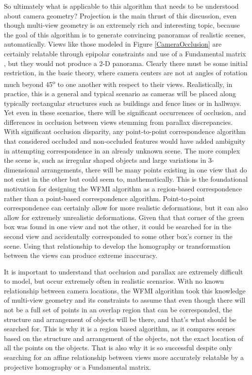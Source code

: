 So ultimately what is applicable to this algorithm that needs to be understood about camera geometry? Projection is the main thrust of this discussion, even though multi-view geometry is an extremely rich and interesting topic, because the goal of this algorithm is to generate convincing panoramas of realistic scenes, automatically. Views like those modeled in Figure \ref{CameraOcclusion} are certainly relatable through epipolar constraints and use of a Fundamental matrix \cite{Hartley2003}, but they would not produce a 2-D panorama. Clearly there must be some initial restriction, in the basic theory, where camera centers are not at angles of rotation much beyond 45\textsuperscript{o} to one another with respect to their views. Realistically, \ie{ }in practice, this is a general and typical scenario as cameras will be placed along typically rectangular structures such as buildings and fence lines or in hallways. Yet even in these scenarios, there will be significant occurrences of occlusion, and differences in occlusion between views stemming from parallax discrepancies. With significant occlusion disparity, any point-to-point correspondence algorithm that considered occluded and non-occluded features would have added ambiguity in attempting correspondence in an already unknown scene. The more complex the scene is, such as irregular shaped objects and large variations in 3-dimensional arrangements, there will be many points existing in one view that do not exist in the other but could seem to, mathematically. This is the foundational motivation for designing the WFMI algorithm as a region-based correspondence rather than a point-based correspondence algorithm. Point-to-point correspondence can certainly allow for more realistic deformations, but it can also allow for extremely unrealistic deformations. Given that that corner of the green box was found in one view and not the other, it could be searched for in the second view and accidentally corresponded to some other box's corner in the scene. Using that relationship to develop the homography or transformation between the views \cite{Hartley2003} can produce extreme inaccuracy.

It is important to understand that occlusion and parallax are extremely difficult to model, but occur extremely often in realistic scenarios. With no known relationship between camera locations, the WFMI algorithm took this knowledge of multi-view geometry and its constraints to assume that even though there will not be a full set of points in an overlap region that can be corresponded, the structure and arrangement of objects will be there, and that's what should be searched for. This is why it is a region based algorithm, as it compares scenes based on the structure and arrangement of the objects, not the exact location of all the points on the objects. That is also why it is so successful despite only searching for an affine relationship between views more accurately relatable by a projective homography or a Fundamental matrix.


